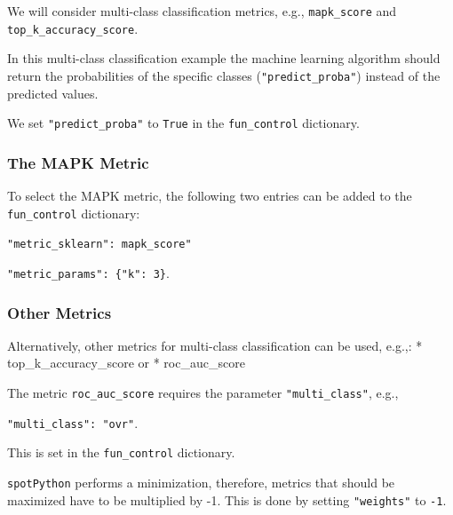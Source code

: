 \documentclass[
  letterpaper,
  DIV=11,
  numbers=noendperiod]{scrreprt}
\begin{document}
We will consider multi-class classification metrics, e.g.,
\texttt{mapk\_score} and \texttt{top\_k\_accuracy\_score}.

\begin{tcolorbox}[enhanced jigsaw, rightrule=.15mm, opacityback=0, colframe=quarto-callout-note-color-frame, opacitybacktitle=0.6, toptitle=1mm, arc=.35mm, colbacktitle=quarto-callout-note-color!10!white, coltitle=black, toprule=.15mm, leftrule=.75mm, titlerule=0mm, title=\textcolor{quarto-callout-note-color}{\faInfo}\hspace{0.5em}{Predict Probabilities}, bottomrule=.15mm, breakable, bottomtitle=1mm, left=2mm, colback=white]

In this multi-class classification example the machine learning
algorithm should return the probabilities of the specific classes
(\texttt{"predict\_proba"}) instead of the predicted values.

\end{tcolorbox}

We set \texttt{"predict\_proba"} to \texttt{True} in the
\texttt{fun\_control} dictionary.

\hypertarget{the-mapk-metric}{%
\subsubsection{The MAPK Metric}\label{the-mapk-metric}}

To select the MAPK metric, the following two entries can be added to the
\texttt{fun\_control} dictionary:

\texttt{"metric\_sklearn":\ mapk\_score"}

\texttt{"metric\_params":\ \{"k":\ 3\}}.

\hypertarget{other-metrics}{%
\subsubsection{Other Metrics}\label{other-metrics}}

Alternatively, other metrics for multi-class classification can be used,
e.g.,: * top\_k\_accuracy\_score or * roc\_auc\_score

The metric \texttt{roc\_auc\_score} requires the parameter
\texttt{"multi\_class"}, e.g.,

\texttt{"multi\_class":\ "ovr"}.

This is set in the \texttt{fun\_control} dictionary.

\begin{tcolorbox}[enhanced jigsaw, rightrule=.15mm, opacityback=0, colframe=quarto-callout-note-color-frame, opacitybacktitle=0.6, toptitle=1mm, arc=.35mm, colbacktitle=quarto-callout-note-color!10!white, coltitle=black, toprule=.15mm, leftrule=.75mm, titlerule=0mm, title=\textcolor{quarto-callout-note-color}{\faInfo}\hspace{0.5em}{Weights}, bottomrule=.15mm, breakable, bottomtitle=1mm, left=2mm, colback=white]

\texttt{spotPython} performs a minimization, therefore, metrics that
should be maximized have to be multiplied by -1. This is done by setting
\texttt{"weights"} to \texttt{-1}.

\end{tcolorbox}
\end{document}
